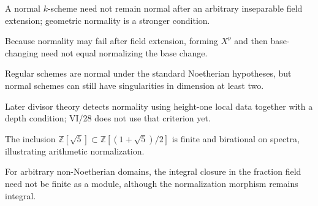 \begin{example}\label{advex:vi28-09}
A normal $k$-scheme need not remain normal after an arbitrary inseparable field extension; geometric normality is a stronger condition.
\end{example}

\begin{example}\label{advex:vi28-10}
Because normality may fail after field extension, forming $X^\nu$ and then base-changing need not equal normalizing the base change.
\end{example}

\begin{example}\label{advex:vi28-11}
Regular schemes are normal under the standard Noetherian hypotheses, but normal schemes can still have singularities in dimension at least two.
\end{example}

\begin{example}\label{advex:vi28-12}
Later divisor theory detects normality using height-one local data together with a depth condition; VI/28 does not use that criterion yet.
\end{example}

\begin{example}\label{advex:vi28-13}
The inclusion $\mathbb Z[\sqrt5]\subset\mathbb Z[(1+\sqrt5)/2]$ is finite and birational on spectra, illustrating arithmetic normalization.
\end{example}

\begin{example}\label{advex:vi28-14}
For arbitrary non-Noetherian domains, the integral closure in the fraction field need not be finite as a module, although the normalization morphism remains integral.
\end{example}
